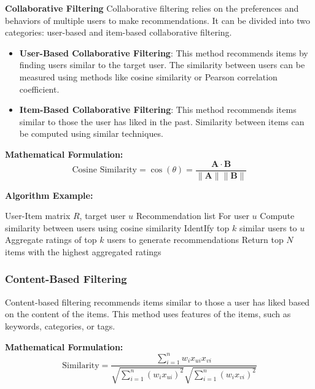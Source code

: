 \documentclass[12pt]{book} %
\begin{document}
\textbf{Collaborative Filtering}
Collaborative filtering relies on the preferences and behaviors of multiple users to make recommendations. It can be divided into two categories: user-based and item-based collaborative filtering.

\begin{itemize}
    \item \textbf{User-Based Collaborative Filtering}: This method recommends items by finding users similar to the target user. The similarity between users can be measured using methods like cosine similarity or Pearson correlation coefficient.
    \item \textbf{Item-Based Collaborative Filtering}: This method recommends items similar to those the user has liked in the past. Similarity between items can be computed using similar techniques.
\end{itemize}

\textbf{Mathematical Formulation:}
\begin{equation}
\text{Cosine Similarity} = \cos(\theta) = \frac{\mathbf{A} \cdot \mathbf{B}}{\|\mathbf{A}\| \|\mathbf{B}\|}
\end{equation}

\textbf{Algorithm Example:}
\begin{algorithm}[H]
\caption{User-Based Collaborative Filtering}
\begin{algorithmic}[1]
\Require User-Item matrix $R$, target user $u$
\Ensure Recommendation list For user $u$
\State Compute similarity between users using cosine similarity
\State IdentIfy top $k$ similar users to $u$
\State Aggregate ratings of top $k$ users to generate recommendations
\State Return top $N$ items with the highest aggregated ratings
\end{algorithmic}
\end{algorithm}

\subsubsection*{Content-Based Filtering}
Content-based filtering recommends items similar to those a user has liked based on the content of the items. This method uses features of the items, such as keywords, categories, or tags.

\textbf{Mathematical Formulation:}
\begin{equation}
\text{Similarity} = \frac{\sum_{i=1}^{n} w_i x_{ui} x_{vi}}{\sqrt{\sum_{i=1}^{n} (w_i x_{ui})^2} \sqrt{\sum_{i=1}^{n} (w_i x_{vi})^2}}
\end{equation}
\end{document}
